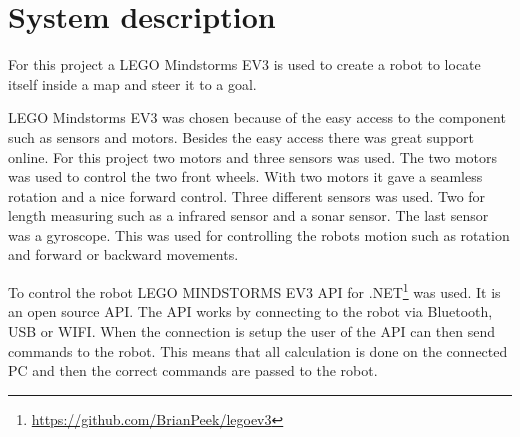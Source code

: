 \chapter{System description}
\label{chp:sysdes}

For this project a LEGO Mindstorms EV3 is used to create a robot to locate itself inside a map and steer it to a goal.

LEGO Mindstorms EV3 was chosen because of the easy access to the component such as sensors and motors. Besides the easy access there was great support online. 
For this project two motors and three sensors was used. The two motors was used to control the two front wheels. With two motors it gave a seamless rotation and a nice forward control. Three different sensors was used. Two for length measuring such as a infrared sensor and a sonar sensor. The last sensor was a gyroscope. This was used for controlling the robots motion such as rotation and forward or backward movements.

To control the robot LEGO MINDSTORMS EV3 API for .NET\footnote{\url{https://github.com/BrianPeek/legoev3}} was used. It is an open source API. The API works by connecting to the robot via Bluetooth, USB or WIFI. When the connection is setup the user of the API can then send commands to the robot. This means that all calculation is done on the connected PC and then the correct commands are passed to the robot.